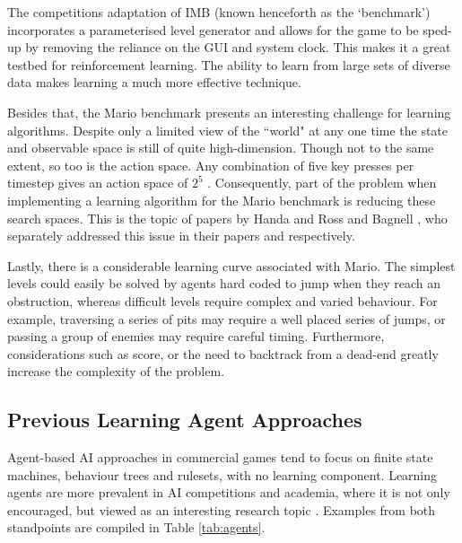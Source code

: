 The competitions adaptation of IMB (known henceforth as the `benchmark') incorporates a parameterised level generator and allows for the game to be sped-up by removing the reliance on the GUI and system clock. This makes it a great testbed for reinforcement learning. The ability to learn from large sets of diverse data makes learning a much more effective technique. \cite[p.~3]{2012the}

Besides that, the Mario benchmark presents an interesting challenge for learning algorithms. Despite only a limited view of the ``world" at any one time the state and observable space is still of quite high-dimension. Though not to the same extent, so too is the action space. Any combination of five key presses per timestep gives an action space of $2^5$ \cite[p.~3]{2012the}. Consequently, part of the problem when implementing a learning algorithm for the Mario benchmark is reducing these search spaces. This is the topic of papers by Handa and Ross and Bagnell \cite{rossbagnell}, who separately addressed this issue in their papers \cite{handa} and \cite{rossbagnell} respectively.

Lastly, there is a considerable learning curve associated with Mario. The simplest levels could easily be solved by agents hard coded to jump when they reach an obstruction, whereas difficult levels require complex and varied behaviour. For example, traversing a series of pits may require a well placed series of jumps, or passing a group of enemies may require careful timing. Furthermore, considerations such as score, or the need to backtrack from a dead-end greatly increase the complexity of the problem. \cite[p.~3, p.~12]{2012the}



\subsection{Previous Learning Agent Approaches}
\label{ssec:prevagents}

Agent-based AI approaches in commercial games tend to focus on finite state machines, behaviour trees and rulesets, with no learning component. Learning agents are more prevalent in AI competitions and academia, where it is not only encouraged, but viewed as an interesting research topic \cite[p.~1]{marioaicomp}. Examples from both standpoints are compiled in Table \ref{tab:agents}.

